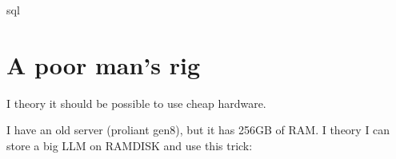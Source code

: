 \documentclass[letterpaper,10pt,english]{sphinxmanual}
\begin{document}
\sphinxAtStartPar
sql


\chapter{A poor man’s rig}
\label{\detokenize{poorman:a-poor-man-s-rig}}\label{\detokenize{poorman::doc}}
\sphinxAtStartPar
I theory it should be possible to use cheap hardware.

\sphinxAtStartPar
I have an old server (proliant gen8), but it has 256GB of RAM.
I theory I can store a big LLM on RAMDISK and use this trick:

\sphinxAtStartPar
{}



\renewcommand{\indexname}{Index}
\printindex
\end{document}
